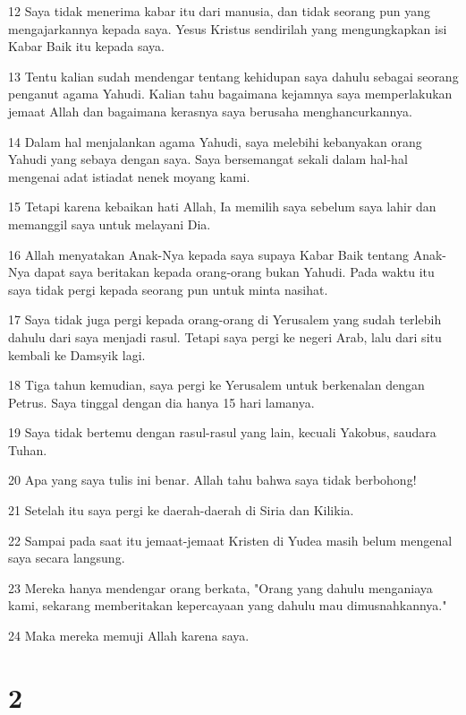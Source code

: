 \par 12 Saya tidak menerima kabar itu dari manusia, dan tidak seorang pun yang mengajarkannya kepada saya. Yesus Kristus sendirilah yang mengungkapkan isi Kabar Baik itu kepada saya.
\par 13 Tentu kalian sudah mendengar tentang kehidupan saya dahulu sebagai seorang penganut agama Yahudi. Kalian tahu bagaimana kejamnya saya memperlakukan jemaat Allah dan bagaimana kerasnya saya berusaha menghancurkannya.
\par 14 Dalam hal menjalankan agama Yahudi, saya melebihi kebanyakan orang Yahudi yang sebaya dengan saya. Saya bersemangat sekali dalam hal-hal mengenai adat istiadat nenek moyang kami.
\par 15 Tetapi karena kebaikan hati Allah, Ia memilih saya sebelum saya lahir dan memanggil saya untuk melayani Dia.
\par 16 Allah menyatakan Anak-Nya kepada saya supaya Kabar Baik tentang Anak-Nya dapat saya beritakan kepada orang-orang bukan Yahudi. Pada waktu itu saya tidak pergi kepada seorang pun untuk minta nasihat.
\par 17 Saya tidak juga pergi kepada orang-orang di Yerusalem yang sudah terlebih dahulu dari saya menjadi rasul. Tetapi saya pergi ke negeri Arab, lalu dari situ kembali ke Damsyik lagi.
\par 18 Tiga tahun kemudian, saya pergi ke Yerusalem untuk berkenalan dengan Petrus. Saya tinggal dengan dia hanya 15 hari lamanya.
\par 19 Saya tidak bertemu dengan rasul-rasul yang lain, kecuali Yakobus, saudara Tuhan.
\par 20 Apa yang saya tulis ini benar. Allah tahu bahwa saya tidak berbohong!
\par 21 Setelah itu saya pergi ke daerah-daerah di Siria dan Kilikia.
\par 22 Sampai pada saat itu jemaat-jemaat Kristen di Yudea masih belum mengenal saya secara langsung.
\par 23 Mereka hanya mendengar orang berkata, "Orang yang dahulu menganiaya kami, sekarang memberitakan kepercayaan yang dahulu mau dimusnahkannya."
\par 24 Maka mereka memuji Allah karena saya.

\chapter{2}

